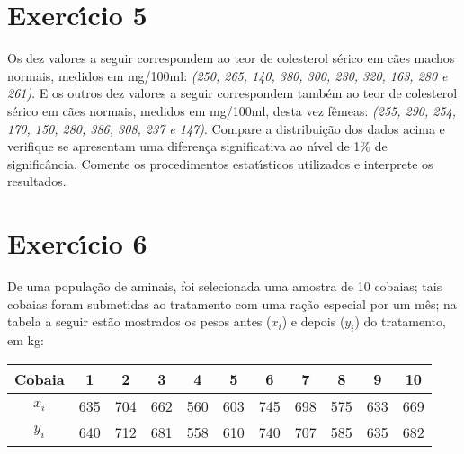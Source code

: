 \documentclass[a4paper,11pt,twoside,openright]{report}
\begin{document}
\section*{Exerc\'{\i}cio 5}
\hspace{0.5cm}Os dez valores a seguir correspondem ao teor de colesterol s\'{e}rico em c\~{a}es machos normais, medidos em mg/100ml: \textit{(250, 265, 140, 380, 
300, 230, 320, 163, 280 e 261)}. E os outros dez valores a seguir correspondem tamb\'{e}m ao teor de colesterol s\'{e}rico em c\~{a}es normais, medidos em mg/100ml, 
desta vez f\^{e}meas: \textit{(255, 290, 254, 170, 150, 280, 386, 308, 237 e 147)}. Compare a distribui\c{c}\~{a}o dos dados acima e verifique se apresentam
uma diferen\c{c}a significativa ao n\'{\i}vel de 1\% de signific\^{a}ncia. Comente os procedimentos estat\'{\i}sticos utilizados e interprete os resultados.\\


\section*{Exerc\'{\i}cio 6}
\hspace{0.5cm}De uma popula\c{c}\~{a}o de aminais, foi selecionada uma amostra de 10 cobaias; tais cobaias foram submetidas ao tratamento com uma ra\c{c}\~{a}o
especial por um m\^{e}s; na tabela a seguir est\~{a}o mostrados os pesos antes ($x_{i}$) e depois ($y_{i}$) do tratamento, em kg:

\begin{center}
\begin{tabular}{|l|l|l|l|l|l|l|l|l|l|l|}
\hline
\multicolumn{1}{|c|}{Cobaia} & \multicolumn{1}{c|}{1} & \multicolumn{1}{c|}{2} & \multicolumn{1}{c|}{3} & \multicolumn{1}{c|}{4} & \multicolumn{1}{c|}{5} & \multicolumn{1}{c|}{6} & \multicolumn{1}{c|}{7} & \multicolumn{1}{c|}{8} & \multicolumn{1}{c|}{9} & \multicolumn{1}{c|}{10} \\ 
\hline
\multicolumn{1}{|c|}{$x_{i}$} & \multicolumn{1}{c|}{635} & \multicolumn{1}{c|}{704} & \multicolumn{1}{c|}{662} & \multicolumn{1}{c|}{560} & \multicolumn{1}{c|}{603} & \multicolumn{1}{c|}{745} & \multicolumn{1}{c|}{698} & \multicolumn{1}{c|}{575} & \multicolumn{1}{c|}{633} & \multicolumn{1}{c|}{669} \\ 
\hline
\multicolumn{1}{|c|}{$y_{i}$} & \multicolumn{1}{c|}{640} & \multicolumn{1}{c|}{712} & \multicolumn{1}{c|}{681} & \multicolumn{1}{c|}{558} & \multicolumn{1}{c|}{610} & \multicolumn{1}{c|}{740} & \multicolumn{1}{c|}{707} & \multicolumn{1}{c|}{585} & \multicolumn{1}{c|}{635} & \multicolumn{1}{c|}{682} \\ 
\hline
\end{tabular}
\end{center}
\end{document}
